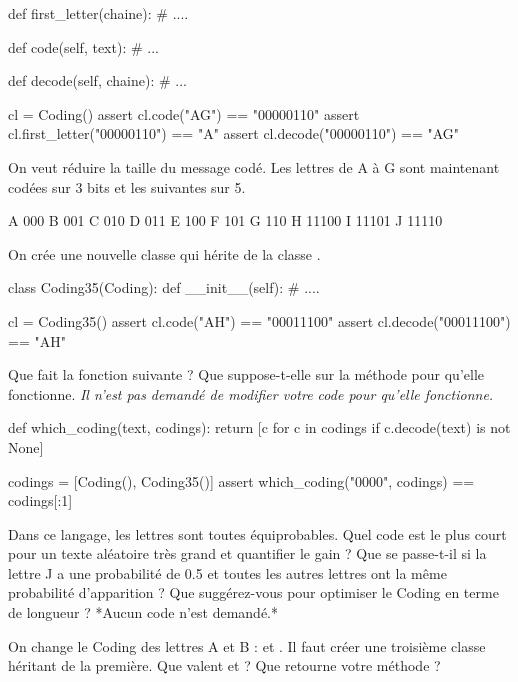 \begin{xexercice}
\begin{verbatimx}
    def first_letter(chaine):
        # ....

    def code(self, text):
        # ...

    def decode(self, chaine):
        # ...

cl = Coding()
assert cl.code("AG") == "00000110"
assert cl.first_letter("00000110") == "A"
assert cl.decode("00000110") == "AG"
\end{verbatimx}

\exequest On veut réduire la taille du message codé.
Les lettres de A à G sont maintenant codées sur 3 bits et les suivantes sur 5.

\begin{verbatimx}
A 000
B 001
C 010
D 011
E 100
F 101
G 110
H 11100
I 11101
J 11110
\end{verbatimx}

On crée une nouvelle classe  qui hérite de la classe .

\begin{verbatimx}
class Coding35(Coding):
    def __init__(self):
        # ....

cl = Coding35()
assert cl.code("AH") == "00011100"
assert cl.decode("00011100") == "AH"
\end{verbatimx}

\exequest Que fait la fonction suivante ? Que suppose-t-elle sur la méthode  pour qu'elle fonctionne.
\textit{Il n'est pas demandé de modifier votre code pour qu'elle fonctionne.}

\begin{verbatimx}
def which_coding(text, codings):
    return [c for c in codings if c.decode(text) is not None]

codings = [Coding(), Coding35()]
assert which_coding("0000", codings) == codings[:1]
\end{verbatimx}

\exequest Dans ce langage, les lettres sont toutes équiprobables.
Quel code est le plus court pour un texte aléatoire très grand et quantifier le gain ?
Que se passe-t-il si la lettre J a une probabilité de 0.5 et toutes les autres lettres ont la même probabilité
d'apparition ? Que suggérez-vous pour optimiser le Coding en terme de longueur ?
*Aucun code n'est demandé.*

\exequest On change le Coding des lettres A et B :  et . Il faut créer une troisième classe
héritant de la première. Que valent  et  ?
Que retourne votre méthode  ?


\end{xexercice}
